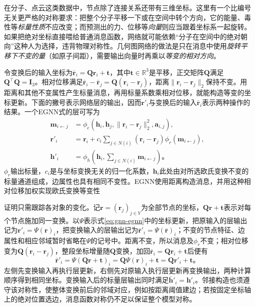 在分子、点云这类数据中，节点除了连接关系还带有三维坐标。这里有一个比编号无关更严格的对称要求：把整个分子平移一下或在空间中转个方向，它的能量、毒性等\emph{标量性质}不应改变；而预测出的力、位移等\emph{向量}则应当跟着坐标系一起旋转。如果把绝对坐标直接喂给普通消息函数，网络就可能依赖“分子在空间中的绝对朝向”这种人为选择，违背物理对称性。几何图网络的做法是只在消息中使用\emph{旋转平移下不变的量}（如原子间距），需要输出向量时再乘以\emph{等变的相对方向}。

令变换后的输入坐标为$\bar{\bm{r}}_i=\bm{Q}\bm{r}_i+\bm{t}$，其中$\bm{t}\in\mathbb{R}^{3}$是平移，正交矩阵$\bm{Q}$满足$\bm{Q}^{\top}\bm{Q}=\bm{I}_3$。相对位移满足$\bar{\bm{r}}_i-\bar{\bm{r}}_j=\bm{Q}(\bm{r}_i-\bm{r}_j)$，距离$\lVert\bm{r}_i-\bm{r}_j\rVert_2$保持不变。用距离和其他不变属性产生标量消息，再用标量系数乘相对位移，就能构造等变的坐标更新。下面的撇号表示网络层的输出，因而$\bm{r}'_i$与变换后的输入$\bar{\bm{r}}_i$表示两种操作的结果。一个EGNN式的层可写为
\begin{equation}
  \begin{aligned}
    \bm{m}_{i\leftarrow j}
      &=\phi_e(\bm{h}_i,\bm{h}_j,
        \lVert\bm{r}_i-\bm{r}_j\rVert_2^2,\bm{a}_{i,j}),\\
    \bm{r}'_i&=\bm{r}_i+
      c_i\sum_{j\in N(i)}(\bm{r}_i-\bm{r}_j)\phi_r(\bm{m}_{i\leftarrow j}),\\
    \bm{h}'_i&=\phi_h\!\left(\bm{h}_i,\sum_{j\in N(i)}\bm{m}_{i\leftarrow j}\right)\text{。}
  \end{aligned}
  \label{eq:gnn-egnn}
\end{equation}
$\phi_r$输出标量，$c_i$是与坐标变换无关的归一化系数，$\bm{h}_i$此处由对所选欧氏变换不变的标量通道组成，边属性也具有相同不变性。EGNN使用距离构造消息，并用这种相对位移加权实现欧氏变换等变性

证明只需跟踪各对象的变化。记$\bm{r}=(\bm{r}_j)_{j\in V}$为全部节点的坐标，$\bm{Q}\bm{r}+\bm{t}$表示对每个节点施加同一变换。以$\Psi$表示式\eqref{eq:gnn-egnn}中的坐标更新，把原输入的层输出记为$\bm{r}'_i=\Psi(\bm{r})_i$，把变换输入的层输出记为$\bar{\bm{r}}'_i=\Psi(\bar{\bm{r}})_i$；不变的节点特征、边属性和相应邻域暂时省略在$\Psi$的记号中。距离不变，所以消息及$\phi_r$不变；相对位移变为$\bm{Q}(\bm{r}_i-\bm{r}_j)$，整段坐标增量随$\bm{Q}$变换，加回$\bar{\bm{r}}_i=\bm{Q}\bm{r}_i+\bm{t}$后便有
\[
  \bar{\bm{r}}'_i
    =\Psi(\bm{Q}\bm{r}+\bm{t})_i
    =\bm{Q}\Psi(\bm{r})_i+\bm{t}
    =\bm{Q}\bm{r}'_i+\bm{t}\text{。}
\]
左侧先变换输入再执行层更新，右侧先对原输入执行层更新再变换输出，两种计算顺序得到相同坐标。变换输入后的标量层输出同时满足$\bar{\bm{h}}'_i=\bm{h}'_i$。邻接构造也须遵守该对称性，使整体变换前后的邻域对应，例如按距离阈值建边；若按固定坐标轴上的绝对位置选边，消息函数对称仍不足以保证整个模型对称。

